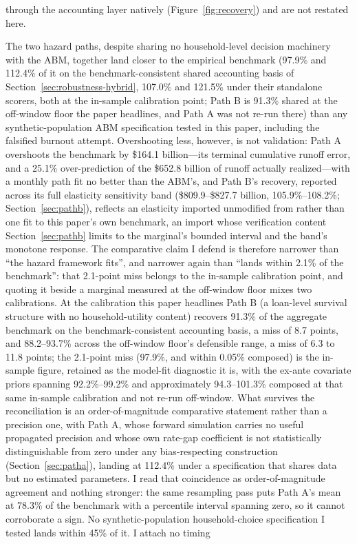 \documentclass[12pt]{article}
\begin{document}
\begin{table}[H]
\begin{threeparttable}
\begin{tablenotes}[flushleft]
through the accounting layer natively (Figure~\ref{fig:recovery}) and are not restated here.
\end{tablenotes}
\end{threeparttable}
\end{table}

The two hazard paths, despite sharing no household-level decision machinery with the ABM, together land closer to the empirical benchmark (97.9\% and 112.4\% of it on the benchmark-consistent shared accounting basis of Section~\ref{sec:robustness-hybrid}, 107.0\% and 121.5\% under their standalone scorers, both at the in-sample calibration point; Path B is 91.3\% shared at the off-window floor the paper headlines, and Path A was not re-run there) than any synthetic-population ABM specification tested in this paper, including the falsified burnout attempt. Overshooting less, however, is not validation: Path A overshoots the benchmark by \$164.1 billion---its terminal cumulative runoff error, and a 25.1\% over-prediction of the \$652.8 billion of runoff actually realized---with a monthly path fit no better than the ABM's, and Path B's recovery, reported across its full elasticity sensitivity band (\$809.9--\$827.7 billion, 105.9\%--108.2\%; Section~\ref{sec:pathb}), reflects an elasticity imported unmodified from \citet{liebersohn2024} rather than one fit to this paper's own benchmark, an import whose verification content Section~\ref{sec:pathb} limits to the marginal's bounded interval and the band's monotone response. The comparative claim I defend is therefore narrower than ``the hazard framework fits'', and narrower again than ``lands within 2.1\% of the benchmark'': that 2.1-point miss belongs to the in-sample calibration point, and quoting it beside a marginal measured at the off-window floor mixes two calibrations. At the calibration this paper headlines Path B (a loan-level survival structure with no household-utility content) recovers 91.3\% of the aggregate benchmark on the benchmark-consistent accounting basis, a miss of 8.7 points, and 88.2--93.7\% across the off-window floor's defensible range, a miss of 6.3 to 11.8 points; the 2.1-point miss (97.9\%, and within 0.05\% composed) is the in-sample figure, retained as the model-fit diagnostic it is, with the ex-ante covariate priors spanning 92.2\%--99.2\% and approximately 94.3--101.3\% composed at that same in-sample calibration and not re-run off-window. What survives the reconciliation is an order-of-magnitude comparative statement rather than a precision one, with Path A, whose forward simulation carries no useful propagated precision and whose own rate-gap coefficient is not statistically distinguishable from zero under any bias-respecting construction (Section~\ref{sec:patha}), landing at 112.4\% under a specification that shares data but no estimated parameters. I read that coincidence as order-of-magnitude agreement and nothing stronger: the same resampling pass puts Path A's mean at 78.3\% of the benchmark with a percentile interval spanning zero, so it cannot corroborate a sign. No synthetic-population household-choice specification I tested lands within 45\% of it. I attach no timing 
\end{document}
